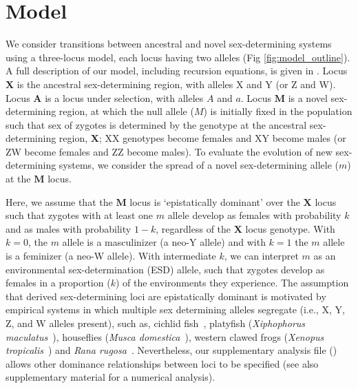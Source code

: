 \documentclass[10pt,letterpaper]{article}
\begin{document}
\section*{Model}

We consider transitions between ancestral and novel sex-determining systems using a three-locus model, each locus having two alleles (Fig \ref{fig:model_outline}). A full description of our model, including recursion equations, is given in . 
Locus $\mathbf{X}$ is the ancestral sex-determining region, with alleles X and Y (or Z and W).
Locus $\mathbf{A}$ is a locus under selection, with alleles $A$ and $a$.
Locus $\mathbf{M}$ is a novel sex-determining region, at which the null allele ($M$) is initially fixed in the population such that sex of zygotes is determined by the genotype at the ancestral sex-determining region, $\mathbf{X}$; XX genotypes become females and XY become males (or ZW become females and ZZ become males). 
To evaluate the evolution of new sex-determining systems, we consider the spread of a novel sex-determining allele ($m$) at the $\mathbf{M}$ locus. 

Here, we assume that the $\mathbf{M}$ locus is `epistatically dominant' over the $\mathbf{X}$ locus such that zygotes with at least one $m$ allele develop as females with probability $k$ and as males with probability $1-k$, regardless of the $\mathbf{X}$ locus genotype. 
With $k=0$, the $m$ allele is a masculinizer (a neo-Y allele) and with $k=1$ the $m$ allele is a feminizer (a neo-W allele). 
With intermediate $k$, we can interpret $m$ as an environmental sex-determination (ESD) allele, such that zygotes develop as females in a proportion ($k$) of the environments they experience. 
The assumption that derived sex-determining loci are epistatically dominant is motivated by empirical systems in which multiple sex determining alleles segregate (i.e., X, Y, Z, and W alleles present), such as, cichlid fish~\cite{Ser:2010iq}, platyfish (\textit{Xiphophorus maculatus}~\cite{Kallman1968}), houseflies (\textit{Musca domestica}~\cite{Dubendorfer2002}), western clawed frogs (\textit{Xenopus tropicalis}~\cite{Roco2015}) and \textit{Rana rugosa}~\cite{Ogata:2007jm}.  
Nevertheless, our supplementary analysis file () allows other dominance relationships between loci to be specified (see also \cite{vanDoorn:2007eu} supplementary material for a numerical analysis). 
\end{document}
